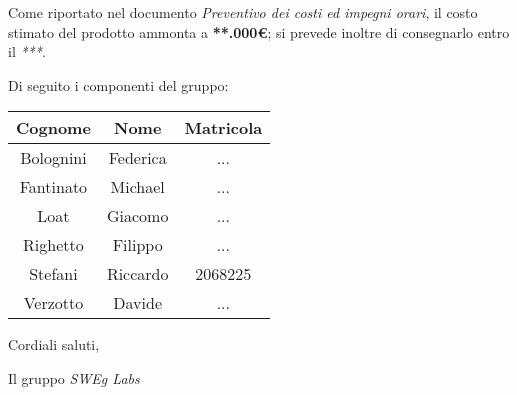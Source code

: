 Come riportato nel documento \emph{Preventivo dei costi ed impegni orari}, il costo stimato del prodotto ammonta a \textbf{**.000€};
si prevede inoltre di consegnarlo entro il \emph{***}.

\vspace{0.5cm}

Di seguito i componenti del gruppo:

\begin{table}[h]
    \centering
    \begin{tabular}{|c|c|c|}
        \hline
        \rowcolor[gray]{0.9}
        \textbf{Cognome} & \textbf{Nome} & \textbf{Matricola}\\
        \hline
        Bolognini & Federica & ... \\
        \hline
        Fantinato & Michael & ... \\
        \hline
        Loat & Giacomo & ... \\
        \hline
        Righetto & Filippo & ... \\
        \hline
        Stefani & Riccardo & 2068225 \\
        \hline
        Verzotto & Davide & ... \\
        \hline
    \end{tabular}
\end{table}

\vspace{0.5cm}

Cordiali saluti,
\begin{flushright}
    Il gruppo \emph{SWEg Labs}
\end{flushright}
